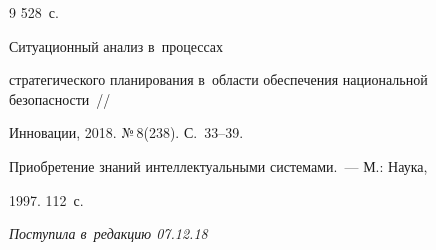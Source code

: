 {{\begin{thebibliography}{9}
528~с. 


 Ситуационный анализ в~процессах 

стратегического планирования в~области обеспечения национальной безопасности~/\!\!/ 

Инновации, 2018. №\,8(238). С.~33--39.


 Приобретение знаний интеллектуальными системами.~--- М.: Наука, 

 1997. 112~с.

        \end{thebibliography}

} }





\vspace*{-9pt}



\hfill{\small\textit{Поступила в~редакцию 07.12.18}}


















\newpage



\vspace*{-24pt}













\def\tit{THE SYSTEM OF~SCIENTIFIC SERVICES AS~A~RELEVANT 

COMPONENT OF~SCIENTIFIC RESEARCH}



\def\titkol{The system of~scientific services as~a~relevant 

component of~scientific research}






